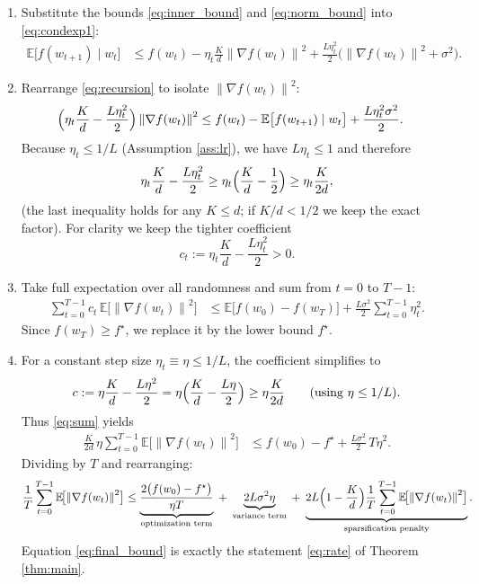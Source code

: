 \documentclass{article}
\newcommand{\E}{\mathbb{E}}
\newcommand{\norm}[1]{\left\|#1\right\|}
\begin{document}
\begin{enumerate}
\item[Step 5.] Substitute the bounds \eqref{eq:inner_bound} and \eqref{eq:norm_bound} into \eqref{eq:condexp1}:
\begin{align}
\E\bigl[f(w_{t+1})\mid w_t\bigr]
&\le f(w_t)-\eta_t\frac{K}{d}\norm{\nabla f(w_t)}^2
   +\frac{L\eta_t^{2}}{2}\bigl(\norm{\nabla f(w_t)}^2+\sigma^{2}\bigr) .
\label{eq:recursion}
\end{align}

\item[Step 6.] Rearrange \eqref{eq:recursion} to isolate \(\norm{\nabla f(w_t)}^2\):
\begin{align}
\Bigl(\eta_t\frac{K}{d}-\frac{L\eta_t^{2}}{2}\Bigr)\norm{\nabla f(w_t)}^2
&\le f(w_t)-\E\bigl[f(w_{t+1})\mid w_t\bigr]
   +\frac{L\eta_t^{2}\sigma^{2}}{2}.
\label{eq:isolated}
\end{align}
Because \(\eta_t\le 1/L\) (Assumption \ref{ass:lr}), we have \(L\eta_t\le 1\) and therefore
\[
\eta_t\frac{K}{d}-\frac{L\eta_t^{2}}{2}\ge \eta_t\Bigl(\frac{K}{d}-\frac12\Bigr)\ge\eta_t\frac{K}{2d},
\]
(the last inequality holds for any \(K\le d\); if \(K/d<1/2\) we keep the exact factor).  
For clarity we keep the tighter coefficient
\[
c_t:=\eta_t\frac{K}{d}-\frac{L\eta_t^{2}}{2}>0 .
\]

\item[Step 7.] Take full expectation over all randomness and sum from \(t=0\) to \(T-1\):
\begin{align}
\sum_{t=0}^{T-1}c_t\,\E\!\bigl[\norm{\nabla f(w_t)}^2\bigr]
&\le \E\!\bigl[f(w_0)-f(w_T)\bigr]
   +\frac{L\sigma^{2}}{2}\sum_{t=0}^{T-1}\eta_t^{2}.
\label{eq:sum}
\end{align}
Since \(f(w_T)\ge f^\star\), we replace it by the lower bound \(f^\star\).

\item[Step 8.] For a constant step size \(\eta_t\equiv\eta\le 1/L\), the coefficient simplifies to
\[
c:=\eta\frac{K}{d}-\frac{L\eta^{2}}{2}
   =\eta\Bigl(\frac{K}{d}-\frac{L\eta}{2}\Bigr)
   \ge \eta\frac{K}{2d}\qquad(\text{using }\eta\le 1/L).
\]
Thus \eqref{eq:sum} yields
\begin{align}
\frac{K}{2d}\,\eta\sum_{t=0}^{T-1}\E\!\bigl[\norm{\nabla f(w_t)}^2\bigr]
&\le f(w_0)-f^\star+\frac{L\sigma^{2}}{2}\,T\eta^{2}.
\end{align}
Dividing by \(T\) and rearranging:
\begin{equation}
\frac{1}{T}\sum_{t=0}^{T-1}\E\!\bigl[\norm{\nabla f(w_t)}^2\bigr]
\le
\underbrace{\frac{2\bigl(f(w_0)-f^\star\bigr)}{\eta T}}_{\text{optimization term}}
\;+\;
\underbrace{2L\sigma^{2}\eta}_{\text{variance term}}
\;+\;
\underbrace{2L\Bigl(1-\frac{K}{d}\Bigr)\frac{1}{T}\sum_{t=0}^{T-1}\E\!\bigl[\norm{\nabla f(w_t)}^2\bigr]}_{\text{sparsification penalty}}.
\label{eq:final_bound}
\end{equation}
Equation \eqref{eq:final_bound} is exactly the statement \eqref{eq:rate} of Theorem \ref{thm:main}.


\end{enumerate}
\end{document}
